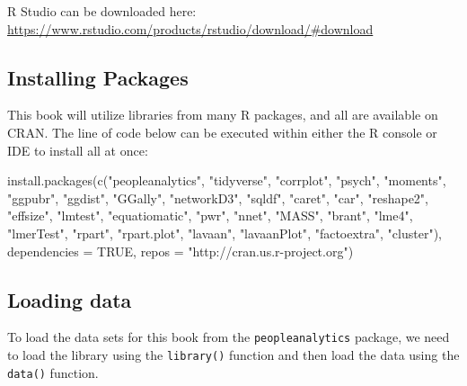 \documentclass[
]{book}
\newenvironment{Shaded}{\begin{snugshade}}{\end{snugshade}}
\newcommand{\AttributeTok}[1]{\textcolor[rgb]{0.77,0.63,0.00}{#1}}
\newcommand{\ConstantTok}[1]{\textcolor[rgb]{0.00,0.00,0.00}{#1}}
\newcommand{\FunctionTok}[1]{\textcolor[rgb]{0.00,0.00,0.00}{#1}}
\newcommand{\NormalTok}[1]{#1}
\newcommand{\StringTok}[1]{\textcolor[rgb]{0.31,0.60,0.02}{#1}}
\begin{document}
R Studio can be downloaded here: \url{https://www.rstudio.com/products/rstudio/download/\#download}

\hypertarget{installing-packages}{%
\subsection{Installing Packages}\label{installing-packages}}

This book will utilize libraries from many R packages, and all are available on CRAN. The line of code below can be executed within either the R console or IDE to install all at once:

\begin{Shaded}
\begin{Highlighting}[]
\FunctionTok{install.packages}\NormalTok{(}\FunctionTok{c}\NormalTok{(}\StringTok{"peopleanalytics"}\NormalTok{, }\StringTok{"tidyverse"}\NormalTok{, }\StringTok{"corrplot"}\NormalTok{, }\StringTok{"psych"}\NormalTok{, }\StringTok{"moments"}\NormalTok{, }\StringTok{"ggpubr"}\NormalTok{, }\StringTok{"ggdist"}\NormalTok{, }\StringTok{"GGally"}\NormalTok{, }\StringTok{"networkD3"}\NormalTok{, }\StringTok{"sqldf"}\NormalTok{, }\StringTok{"caret"}\NormalTok{, }\StringTok{"car"}\NormalTok{, }\StringTok{"reshape2"}\NormalTok{, }\StringTok{"effsize"}\NormalTok{, }\StringTok{"lmtest"}\NormalTok{, }\StringTok{"equatiomatic"}\NormalTok{, }\StringTok{"pwr"}\NormalTok{, }\StringTok{"nnet"}\NormalTok{, }\StringTok{"MASS"}\NormalTok{, }\StringTok{"brant"}\NormalTok{, }\StringTok{"lme4"}\NormalTok{, }\StringTok{"lmerTest"}\NormalTok{, }\StringTok{"rpart"}\NormalTok{, }\StringTok{"rpart.plot"}\NormalTok{, }\StringTok{"lavaan"}\NormalTok{, }\StringTok{"lavaanPlot"}\NormalTok{, }\StringTok{"factoextra"}\NormalTok{, }\StringTok{"cluster"}\NormalTok{), }\AttributeTok{dependencies =} \ConstantTok{TRUE}\NormalTok{, }\AttributeTok{repos =} \StringTok{"http://cran.us.r{-}project.org"}\NormalTok{)}
\end{Highlighting}
\end{Shaded}

\hypertarget{loading-data}{%
\subsection{Loading data}\label{loading-data}}

To load the data sets for this book from the \texttt{peopleanalytics} package, we need to load the library using the \texttt{library()} function and then load the data using the \texttt{data()} function.
\end{document}
